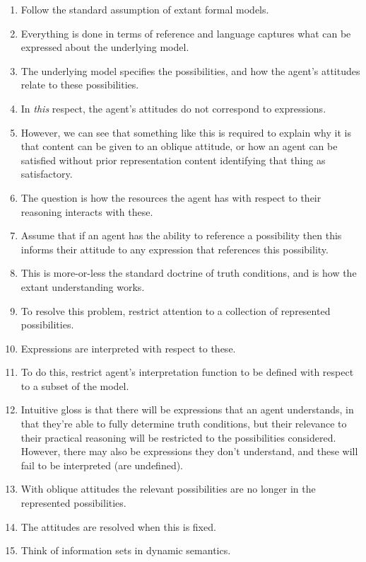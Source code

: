 \documentclass[10pt]{article}
\begin{document}
\begin{enumerate}
\item Follow the standard assumption of extant formal models.
\item Everything is done in terms of reference and language captures what can be expressed about the underlying model.
\item The underlying model specifies the possibilities, and how the agent's attitudes relate to these possibilities.
\item In \emph{this} respect, the agent's attitudes do not correspond to expressions.
\item However, we can see that something like this is required to explain why it is that content can be given to an oblique attitude, or how an agent can be satisfied without prior representation content identifying that thing as satisfactory.
\item The question is how the resources the agent has with respect to their reasoning interacts with these.
\item Assume that if an agent has the ability to reference a possibility then this informs their attitude to any expression that references this possibility.
\item This is more-or-less the standard doctrine of truth conditions, and is how the extant understanding works.
\item To resolve this problem, restrict attention to a collection of represented possibilities.
\item Expressions are interpreted with respect to these.
\item To do this, restrict agent's interpretation function to be defined with respect to a subset of the model.
\item Intuitive gloss is that there will be expressions that an agent understands, in that they're able to fully determine truth conditions, but their relevance to their practical reasoning will be restricted to the possibilities considered.
  However, there may also be expressions they don't understand, and these will fail to be interpreted (are undefined).
\item With oblique attitudes the relevant possibilities are no longer in the represented possibilities.
\item The attitudes are resolved when this is fixed.
\item Think of information sets in dynamic semantics.
\end{enumerate}
\end{document}
